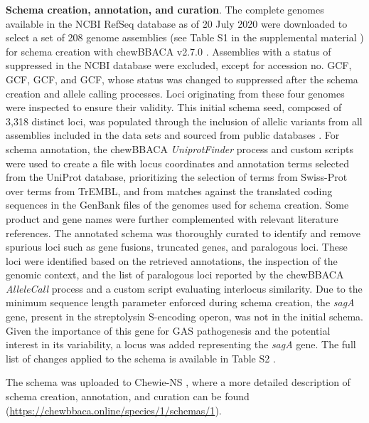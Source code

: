 \textbf{Schema creation, annotation, and curation}. The complete genomes available in the \ac{NCBI} RefSeq database as of 20 July 2020 were downloaded to select a set of 208 genome assemblies (see Table S1 in the supplemental material \cite{friaes_supplemental_2023}) for schema creation with chewBBACA v2.7.0 \cite{silva_chewbbaca_2018}. Assemblies with a status of suppressed in the \ac{NCBI} database were excluded, except for accession no. GCF, GCF, GCF, and GCF, whose status was changed to suppressed after the schema creation and allele calling processes. Loci originating from these four genomes were inspected to ensure their validity. This initial schema seed, composed of 3,318 distinct loci, was populated through the inclusion of allelic variants from all assemblies included in the data sets and sourced from public databases \cite{blackwell_exploring_2021, oleary_reference_2016}. For schema annotation, the chewBBACA \textit{UniprotFinder} process and custom scripts were used to create a file with locus coordinates and annotation terms selected from the UniProt database, prioritizing the selection of terms from Swiss-Prot over terms from TrEMBL, and from matches against the translated coding sequences in the GenBank files of the genomes used for schema creation. Some product and gene names were further complemented with relevant literature references. The annotated schema was thoroughly curated to identify and remove spurious loci such as gene fusions, truncated genes, and paralogous loci. These loci were identified based on the retrieved annotations, the inspection of the genomic context, and the list of paralogous loci reported by the chewBBACA \textit{AlleleCall} process and a custom script evaluating interlocus similarity. Due to the minimum sequence length parameter enforced during schema creation, the \textit{sagA} gene, present in the streptolysin S-encoding operon, was not in the initial schema. Given the importance of this gene for \ac{GAS} pathogenesis and the potential interest in its variability, a locus was added representing the \textit{sagA} gene. The full list of changes applied to the schema is available in Table S2 \cite{friaes_supplemental_2023}.

The schema was uploaded to \ac{Chewie-NS} \cite{mamede_chewie_2021}, where a more detailed description of schema creation, annotation, and curation can be found (\url{https://chewbbaca.online/species/1/schemas/1}).


